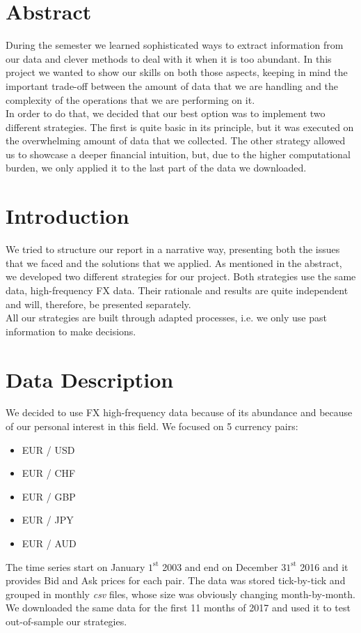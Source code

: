 \documentclass[a4paper]{article}
\begin{document}
\newpage



\section{Abstract}

During the semester we learned sophisticated ways to extract information from our data and clever methods to deal with it when it is too abundant. In this project we wanted to show our skills on both those aspects, keeping in mind the important trade-off between the amount of data that we are handling and the complexity of the operations that we are performing on it.\\
In order to do that, we decided that our best option was to implement two different strategies. The first is quite basic in its principle, but it was executed on the overwhelming amount of data that we collected. The other strategy allowed us to showcase a deeper financial intuition, but, due to the higher computational burden, we only applied it to the last part of the data we downloaded.


\section{Introduction}

We tried to structure our report in a narrative way, presenting both the issues that we faced and the solutions that we applied. As mentioned in the abstract, we developed two different strategies for our project. Both strategies use the same data, high-frequency FX data. Their rationale and results are quite independent and will, therefore, be presented separately.\\
All our strategies are built through adapted processes, i.e. we only use past information to make decisions.\\ 


\section{Data Description}

We decided to use FX high-frequency data because of its abundance and because of our personal interest in this field. We focused on 5 currency pairs:
\begin{itemize}
\item EUR / USD
\item EUR / CHF
\item EUR / GBP
\item EUR / JPY
\item EUR / AUD
\end{itemize}
The time series start on January $1^{\text{st}}$ 2003 and end on December $31^{\text{st}}$ 2016 and it provides Bid and Ask prices for each pair. The data was stored tick-by-tick and grouped in monthly \emph{csv} files, whose size was obviously changing month-by-month.\\
We downloaded the same data for the first 11 months of 2017 and used it to test out-of-sample our strategies.
\end{document}
